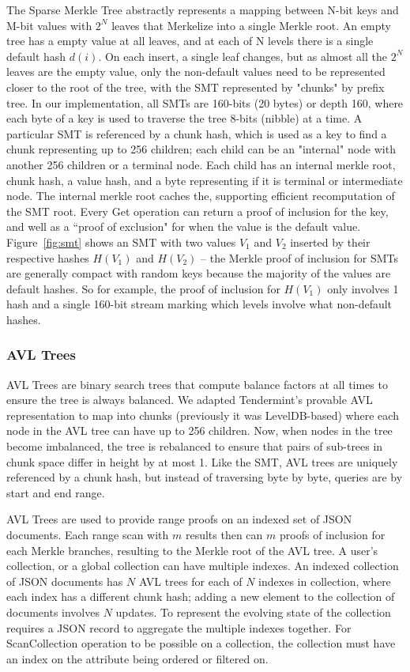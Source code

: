 \documentclass[journal]{IEEEtran}
\newcommand{\tx}[1]{\textsf{#1}}
\begin{document}
The Sparse Merkle Tree \cite{Dahlberg2016EfficientSM,lauriekasper2012} abstractly represents a mapping between N-bit keys and M-bit values with $2^N$ leaves that Merkelize into a single Merkle root.  An empty tree has a empty value at all leaves, and at each of N levels there is a single default hash $d(i)$.  On each insert, a single leaf changes, but as almost all the $2^N$ leaves are the empty value, only the non-default values need to be represented closer to the root of the tree, with the SMT represented by  "chunks" by prefix tree.  In our implementation, all SMTs are 160-bits (20 bytes) or depth 160, where each byte of a key is used to traverse the tree 8-bits (nibble) at a time.  A particular SMT is referenced by a chunk hash, which is used as a key to find a chunk representing up to 256 children; each child can be an "internal" node with another 256 children or a terminal node.    Each child has an internal merkle root, chunk hash, a value hash, and a byte representing if it is terminal or intermediate node.   The internal merkle root caches the, supporting efficient recomputation of the SMT root.     Every \tx{Get} operation can return a proof of inclusion for the key, and well as a ``proof of exclusion" for when the value is the default value.   Figure~\ref{fig:smt} shows an SMT with two values $V_1$ and $V_2$ inserted by their respective hashes $H(V_1)$ and $H(V_2)$ -- the Merkle proof of inclusion for SMTs are generally compact with random keys because the majority of the values are default hashes.  So for example, the proof of inclusion for $H(V_1)$ only involves 1 hash and a single 160-bit stream marking which levels involve what non-default hashes.

\subsubsection{AVL Trees}

AVL Trees are binary search trees that compute balance factors at all times to ensure the tree is always balanced.  We adapted Tendermint's provable AVL representation to map into chunks (previously it was LevelDB-based) where each node in the AVL tree can have up to 256 children.  Now, when nodes in the tree become imbalanced, the tree is rebalanced to ensure that pairs of sub-trees in chunk space differ in height by at most 1.  Like the SMT, AVL trees are uniquely referenced by a chunk hash, but instead of traversing byte by byte, queries are by start and end range.

AVL Trees are used to provide range proofs on an indexed set of JSON documents.  Each range scan with $m$ results then can $m$ proofs of inclusion for each Merkle branches, resulting to the Merkle root of the AVL tree.  A user's collection, or a global collection can have multiple indexes.  An indexed collection of JSON documents has $N$ AVL trees for each of $N$ indexes in collection, where each index has a different chunk hash; adding a new element to the collection of documents involves $N$ updates.  To represent the evolving state of the collection requires a JSON record to aggregate the multiple indexes together.   For \tx{ScanCollection} operation to be possible on a collection, the collection must have an index on the attribute being ordered or filtered on.
\end{document}
